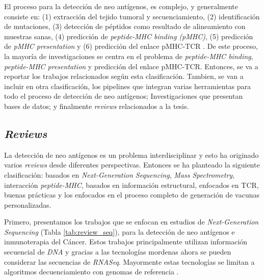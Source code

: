  El proceso para la detección de neo antígenos, es complejo, y generalmente consiste en: (1) extracción del tejido tumoral y secuenciamiento, (2) identificación de mutaciones, (3) detección de péptidos como resultado de alineamiento con muestras sanas, (4) predicción de \textit{peptide-MHC binding (pMHC)}, (5) predicción de \textit{pMHC presentation} y (6) predicción del enlace pMHC-TCR \citep{de2020neoantigen, peng2019neoantigen}. De este proceso, la mayoría de investigaciones se centra en el problema de \textit{peptide-MHC binding}, \textit{peptide-MHC presentation} y predicción del enlace pMHC-TCR. Entonces, se va a reportar los trabajos relacionados según esta clasificación. Tambien, se van a incluir en otra clasificación, los pipelines que integran varias herramientas para todo el proceso de detección de neo antígenos; Investigaciones que presentan bases de datos; y finalmente \textit{reviews} relacionados a la tesis.


\subsection{\textit{Reviews}}

La detección de neo antígenos es un problema interdisciplinar y esto ha originado  varios \textit{reviews} desde diferentes perspectivas. Entonces se ha planteado la siguiente clasificación: basados en \textit{Next-Generation Sequencing}, \textit{Mass Spectrometry}, interacción \textit{peptide-MHC}, basados en información estructural, enfocados en TCR, buenas prácticas y los enfocados en el proceso completo de generación de vacunas personalizadas.

Primero, presentamos los trabajos que se enfocan en estudios de \textit{Next-Generation Sequencing} (Tabla \ref{tab:review_seq}), para la detección de neo antígenos e inmunoterapia del Cáncer. Estos trabajos principalmente utilizan información secuencial de \textit{DNA} y gracias a las tecnologías mordenas ahora se pueden considerar las secuencias de \textit{RNASeq}. Mayormente estas tecnologías se limitan a algoritmos decuenciamiento con genomas de referencia \cite{groisberg2018immunotherapy}.

